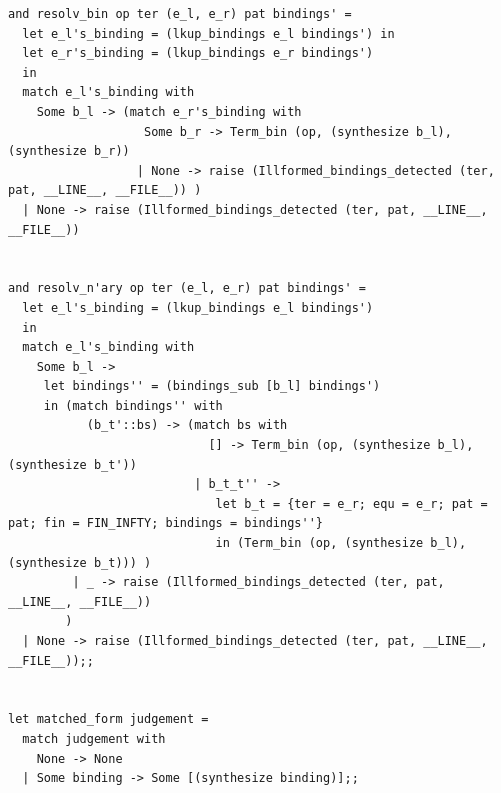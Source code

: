 \documentclass[12pt]{article}
\begin{document}
\begin{tiny}
\begin{verbatim}
and resolv_bin op ter (e_l, e_r) pat bindings' = 
  let e_l's_binding = (lkup_bindings e_l bindings') in
  let e_r's_binding = (lkup_bindings e_r bindings')
  in
  match e_l's_binding with
    Some b_l -> (match e_r's_binding with
                   Some b_r -> Term_bin (op, (synthesize b_l), (synthesize b_r))
                  | None -> raise (Illformed_bindings_detected (ter, pat, __LINE__, __FILE__)) )
  | None -> raise (Illformed_bindings_detected (ter, pat, __LINE__, __FILE__))


and resolv_n'ary op ter (e_l, e_r) pat bindings' = 
  let e_l's_binding = (lkup_bindings e_l bindings')
  in
  match e_l's_binding with
    Some b_l ->
     let bindings'' = (bindings_sub [b_l] bindings')
     in (match bindings'' with
           (b_t'::bs) -> (match bs with
                            [] -> Term_bin (op, (synthesize b_l), (synthesize b_t'))
                          | b_t_t'' ->
                             let b_t = {ter = e_r; equ = e_r; pat = pat; fin = FIN_INFTY; bindings = bindings''}
                             in (Term_bin (op, (synthesize b_l), (synthesize b_t))) )
         | _ -> raise (Illformed_bindings_detected (ter, pat, __LINE__, __FILE__))
        )
  | None -> raise (Illformed_bindings_detected (ter, pat, __LINE__, __FILE__));;


let matched_form judgement =
  match judgement with
    None -> None
  | Some binding -> Some [(synthesize binding)];;



\end{verbatim}
\end{tiny}
\end{document}
